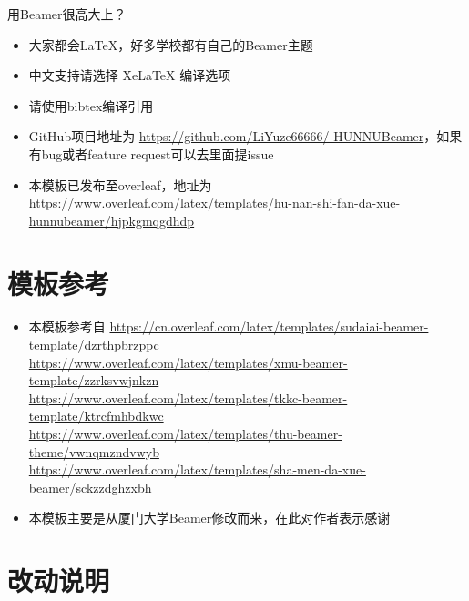 \documentclass{beamer}
\begin{document}
\begin{frame}{用Beamer很高大上？}
    \begin{itemize}[<+-| alert@+>] %
        \item 大家都会\LaTeX{}，好多学校都有自己的\textrm{Beamer}主题
        \item 中文支持请选择 Xe\LaTeX{} 编译选项
        \item 请使用bibtex编译引用
        \item GitHub项目地址为 \href{https://github.com/LiYuze66666/-HUNNUBeamer}{https://github.com/LiYuze66666/-HUNNUBeamer}，如果有bug或者feature request可以去里面提issue
        \item 本模板已发布至overleaf，地址为 \href{https://www.overleaf.com/latex/templates/hu-nan-shi-fan-da-xue-hunnubeamer/hjpkgmqgdhdp}{https://www.overleaf.com/latex/templates/hu-nan-shi-fan-da-xue-hunnubeamer/hjpkgmqgdhdp}
    \end{itemize}
\end{frame}


\section{模板参考}

\begin{frame}
    \begin{itemize}[<+->]
		\item 本模板参考自 \url{https://cn.overleaf.com/latex/templates/sudaiai-beamer-template/dzrthpbrzppc}\cite{origin1}\\
		\url{https://www.overleaf.com/latex/templates/xmu-beamer-template/zzrksvwjnkzn}\cite{origin2}\\
		\url{https://www.overleaf.com/latex/templates/tkkc-beamer-template/ktrcfmhbdkwc}\cite{origin3}\\
		\url{https://www.overleaf.com/latex/templates/thu-beamer-theme/vwnqmzndvwyb}\cite{origin4}\\
		\url{https://www.overleaf.com/latex/templates/sha-men-da-xue-beamer/sckzzdghzxbh}\cite{origin5}
		\item 本模板主要是从厦门大学Beamer修改而来，在此对作者表示感谢
    \end{itemize}
\end{frame}


\section{改动说明}
\end{document}
